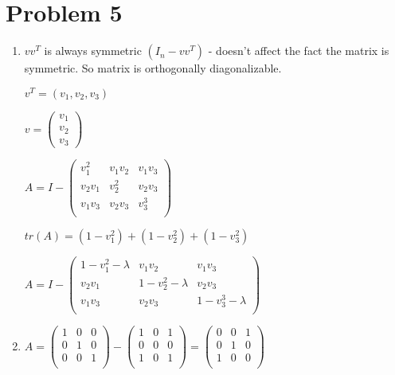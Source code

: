 \documentclass[12pt,letterpaper]{article}
\begin{document}
\section*{Problem 5}
    \begin{enumerate}[label=(\alph*)]
        \item
        $vv^T$ is always symmetric $(I_n - vv^T)$ - doesn't affect the fact the matrix is symmetric. So matrix is orthogonally diagonalizable.
        
        $v^T = (v_1, v_2, v_3)$
        
        $v = \begin{pmatrix} v_1 \\ v_2 \\ v_3 \end{pmatrix}$
        
        $A = I - \begin{pmatrix}
            v_1^2 & v_1v_2 & v_1v_3 \\
            v_2v_1 & v_2^2 & v_2v_3 \\
            v_1v_3 & v_2v_3 & v_3^3 \\
        \end{pmatrix}$
        
        $tr(A) = (1 - v_1^2) + (1 - v_2^2) + (1 - v_3^2)$
        
        $A = I - \begin{pmatrix}
            1 - v_1^2 - \lambda & v_1v_2 & v_1v_3 \\
            v_2v_1 & 1 - v_2^2 - \lambda & v_2v_3 \\
            v_1v_3 & v_2v_3 & 1 - v_3^3 - \lambda \\
        \end{pmatrix}$
        \item
        $A = \begin{pmatrix}
            1 & 0 & 0 \\
            0 & 1 & 0 \\
            0 & 0 & 1 \\
        \end{pmatrix} - \begin{pmatrix}
            1 & 0 & 1 \\
            0 & 0 & 0 \\
            1 & 0 & 1 \\
        \end{pmatrix} = \begin{pmatrix}
            0 & 0 & 1 \\
            0 & 1 & 0 \\
            1 & 0 & 0 \\
        \end{pmatrix}$
        

\end{enumerate}
\end{document}
